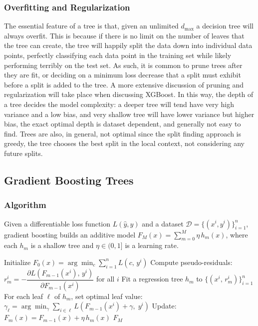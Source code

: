 \documentclass[a4paper, 11pt]{article}
\begin{document}
\subsubsection{Overfitting and Regularization}

The essential feature of a tree is that, given an unlimited
$d_{\text{max}}$ a decision tree will always
overfit. This is because if there is no limit on the number of leaves
that the tree can create, the tree will happily split the data down
into individual data points, perfectly classifying each data point in
the training set while likely performing terribly on the test set. As
such, it is common to prune trees after they are fit, or deciding on
a minimum loss decrease that a split must exhibit before a split is
added to the tree. A more extensive discussion of pruning and
regularization will take place when discussing XGBoost.
In this way,
the depth of a tree decides the model complexity: a deeper tree will
tend have very high variance and a low bias, and very shallow tree
will have lower variance but higher bias, the exact optimal depth is
dataset dependent, and generally not easy to find.
Trees are
also, in general, not optimal since the split finding approach is
greedy, the tree chooses the best split in the local context, not
considering any future splits.

\subsection{Gradient Boosting Trees}

\subsubsection{Algorithm}

Given a differentiable loss function $L(\hat{y}, y)$ and a dataset
$\mathcal{D} = \{(x^i, y^i)\}_{i=1}^{n}$, gradient boosting builds
an additive model $F_M(x) = \sum_{m=0}^{M} \eta \, h_m(x)$, where
each $h_m$ is a shallow tree and $\eta \in (0,1]$ is a learning rate.

\begin{algorithm}
  \caption{Gradient Boosting}\label{alg:gb}
  \begin{algorithmic}[1]
    \State Initialize $F_0(x) = \displaystyle\arg\min_{c}
    \sum_{i=1}^{n} L(c,\, y^i)$
    \State Compute pseudo-residuals:
    $r^i_m = -\dfrac{\partial L(F_{m-1}(x^i),\, y^i)}
    {\partial F_{m-1}(x^i)}$
    \quad for all $i$
    \State Fit a regression tree $h_m$ to
    $\{(x^i,\, r^i_m)\}_{i=1}^{n}$
    \State For each leaf $\ell$ of $h_m$, set optimal leaf value:
    $\gamma_\ell = \displaystyle\arg\min_{\gamma}
    \sum_{i \in \ell} L\!\left(F_{m-1}(x^i) + \gamma,\; y^i\right)$
    \State Update: $F_m(x) = F_{m-1}(x) + \eta \, h_m(x)$
    \EndFor
    \State \Return $F_M$
  \end{algorithmic}
\end{algorithm}
\end{document}
